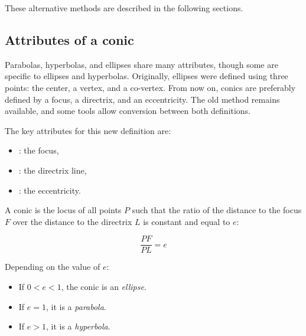 These alternative methods are described in the following sections.


\subsection{Attributes of a conic} %
\label{sub:attributes_of_a_conic}

Parabolas, hyperbolas, and ellipses share many attributes, though some are specific to ellipses and hyperbolas. Originally, ellipses were defined using three points: the center, a vertex, and a co-vertex. From now on, conics are preferably defined by a focus, a directrix, and an eccentricity. The old method remains available, and some tools allow conversion between both definitions.

\vspace{1em}

The key attributes for this new definition are:
\begin{itemize}
  \item {} : the focus,
  \item {} : the directrix line,
  \item {} : the eccentricity.
\end{itemize}

\vspace{1em}

A conic is the locus of all points $P$ such that the ratio of the distance to the focus $F$ over the distance to the directrix $L$ is constant and equal to $e$:

\[
\frac{PF}{PL} = e
\]

Depending on the value of $e$:
\begin{itemize}
  \item If $0 < e < 1$, the conic is an \emph{ellipse}.
  \item If $e = 1$, it is a \emph{parabola}.
  \item If $e > 1$, it is a \emph{hyperbola}.
\end{itemize}



